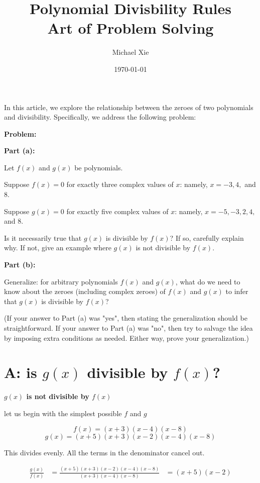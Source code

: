 \usepackage{amssymb}
\usepackage{amsmath}
\usepackage{amsfonts}

\title{Polynomial Divisbility Rules \\ Art of Problem Solving}
\author{Michael Xie}
\date{\today}



\maketitle

In this article, we explore the relationship between the zeroes of two polynomials and divisibility. Specifically, we address the following problem:

\textbf{Problem:}

\textbf{Part (a):}

Let $f(x)$ and $g(x)$ be polynomials.

Suppose $f(x)=0$ for exactly three complex values of $x$: namely, $x=-3,4,$ and $8$.

Suppose $g(x)=0$ for exactly five complex values of $x$: namely, $x=-5,-3,2,4,$ and $8$.

Is it necessarily true that $g(x)$ is divisible by $f(x)$? If so, carefully explain why. If not, give an example where $g(x)$ is not divisible by $f(x)$.

\textbf{Part (b):}

Generalize: for arbitrary polynomials $f(x)$ and $g(x)$, what do we need to know about the zeroes (including complex zeroes) of $f(x)$ and $g(x)$ to infer that $g(x)$ is divisible by $f(x)$?

(If your answer to Part (a) was "yes", then stating the generalization should be straightforward. If your answer to Part (a) was "no", then try to salvage the idea by imposing extra conditions as needed. Either way, prove your generalization.)

\section{A: is $g(x)$ divisible by $f(x)$?}

\textbf{$g(x)$ is not divisible by $f(x)$}

let us begin with the simplest possible $f$ and $g$

\[ f(x) = (x+3)(x-4)(x-8) \]
\[ g(x) = (x+5)(x+3)(x-2)(x-4)(x-8) \]

This divides evenly. All the terms in the denominator cancel out.

\begin{align*}
    \frac{g(x)}{f(x)} & = \frac{(x+5)(x+3)(x-2)(x-4)(x-8)}{(x+3)(x-4)(x-8)}
    & = (x+5)(x-2)
\end{align*}

